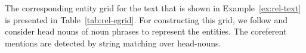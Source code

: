 



%

The corresponding entity grid for the text that is shown in Example~\ref{ex:rel-text} is presented in Table~\ref{tab:rel-egrid}. 
For constructing this grid, we follow  and consider head nouns of noun phrases to represent the entities.  
The coreferent mentions are detected by string matching over head-nouns. 

